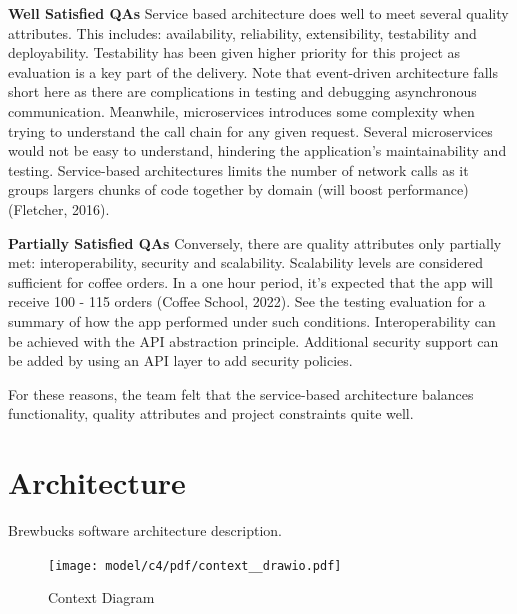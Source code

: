 \documentclass{article}
\begin{document}
\medskip \noindent \textbf{Well Satisfied QAs}
\hfill \break Service based architecture does well to meet several quality attributes. This includes: availability, reliability, extensibility, testability and deployability. Testability has been given higher priority for this project as evaluation is a key part of the delivery. Note that event-driven architecture falls short here as there are complications in testing and debugging asynchronous communication. Meanwhile, microservices introduces some complexity when trying to understand the call chain for any given request. Several microservices would not be easy to understand, hindering the application's maintainability and testing. Service-based architectures limits the number of network calls as it groups largers chunks of code together by domain (will boost performance) (Fletcher, 2016).

\medskip \noindent \textbf{Partially Satisfied QAs}
\hfill \break Conversely, there are quality attributes only partially met: interoperability, security and scalability. Scalability levels are considered sufficient for coffee orders. In a one hour period, it's expected that the app will receive 100 - 115 orders (Coffee School, 2022). See the testing evaluation for a summary of how the app performed under such conditions. Interoperability can be achieved with the API abstraction principle. Additional security support can be added by using an API layer to add security policies.

\hfill \break For these reasons, the team felt that the service-based architecture balances functionality, quality attributes and project constraints quite well.  

\section{Architecture}
Brewbucks software architecture description.

\begin{figure}
    \centering
    \texttt{[image: model/c4/pdf/context\_\_drawio.pdf]}
    \caption{Context Diagram}
    \label{fig:context}
\end{figure}
\end{document}
